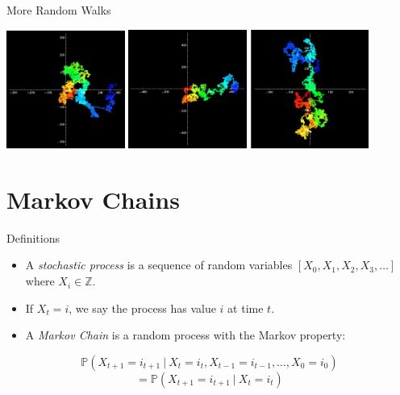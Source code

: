 \documentclass[aspectratio=169, handout]{beamer}
\newcommand{\pp}[0]{\mathbb{P}}
\begin{document}
\begin{frame}{More Random Walks}
    \begin{center}
        \includegraphics[width=110pt]{rws/rw1.png}
        \includegraphics[width=110pt]{rws/rw2.png}
        \includegraphics[width=110pt]{rws/rw3.png}
    \end{center}
\end{frame}
\section{Markov Chains}
\frame{\sectionpage}

\begin{frame}{Definitions}
    \begin{itemize}
        \item A \textit{stochastic process} is a sequence of random variables 
        $[X_0,X_1,X_2,X_3,\dots]$ where $X_i \in \mathbb{Z}$.\pause
        \item If $X_t = i$, we say the process has value $i$ at time $t$. \pause
        \item A \textit{Markov Chain} is a random process with the Markov property:
    \end{itemize}
    \[ \pp(X_{t+1} = i_{t+1}~|~X_{t} = i_t,X_{t-1} = i_{t-1},\dots,X_0 = i_0)\]
    \[=\pp(X_{t+1} = i_{t+1}~|~X_{t} = i_t)\]
\end{frame}
\end{document}
